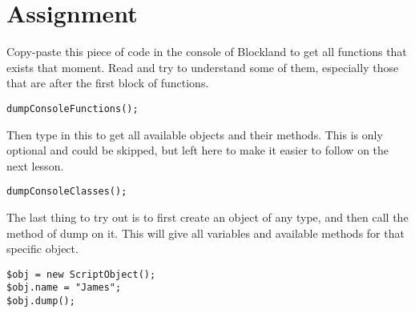 \section{Assignment}

Copy-paste this piece of code in the console of Blockland to get all functions that exists that moment. Read and try to understand some of them, especially those that are after the first block of functions.

\begin{lstlisting}[style=ts]
dumpConsoleFunctions();
\end{lstlisting}

Then type in this to get all available objects and their methods. This is only optional and could be skipped, but left here to make it easier to follow on the next lesson.

\begin{lstlisting}[style=ts]
dumpConsoleClasses();
\end{lstlisting}

The last thing to try out is to first create an object of any type, and then call the method of dump on it. This will give all variables and available methods for that specific object.

\begin{lstlisting}[style=ts]
$obj = new ScriptObject();
$obj.name = "James";
$obj.dump();
\end{lstlisting}

